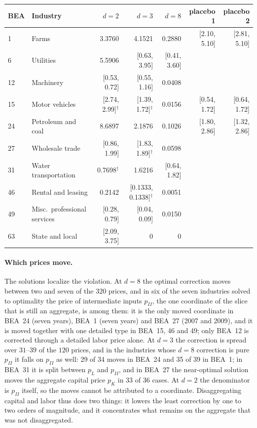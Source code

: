 \begin{table}[t]
{\small\begin{tabular}{llrrrrr}
\toprule
BEA & Industry & $d=2$ & $d=3$ & $d=8$ & placebo 1 & placebo 2 \\
\midrule
1 & Farms & 3.3760 & 4.1521 & 0.2880 & [2.10, 5.10] & [2.81, 5.10] \\
6 & Utilities & 5.5906 & [0.63, 3.95] & [0.41, 3.60] & & \\
12 & Machinery & [0.53, 0.72] & [0.55, 1.16] & 0.0408 & & \\
15 & Motor vehicles & [2.74, 2.99]$^\dagger$ & [1.39, 1.72]$^\dagger$ & 0.0156 & [0.54, 1.72] & [0.64, 1.72] \\
24 & Petroleum and coal & 8.6897 & 2.1876 & 0.1026 & [1.80, 2.86] & [1.32, 2.86] \\
27 & Wholesale trade & [0.86, 1.99] & [1.83, 1.89]$^\dagger$ & 0.0598 & & \\
31 & Water transportation & 0.7698$^\dagger$ & 1.6216 & [0.64, 1.82] & & \\
46 & Rental and leasing & 0.2142 & [0.1333, 0.1338]$^\dagger$ & 0.0051 & & \\
49 & Misc.\ professional services & [0.28, 0.79] & [0.04, 0.09] & 0.0150 & & \\
63 & State and local & [2.09, 3.75] & 0 & 0 & & \\
\bottomrule
\end{tabular}}
{}
\end{table}

\paragraph{Which prices move.} The solutions localize the violation. At $d=8$ the optimal correction moves between two and seven of the $320$ prices, and in six of the seven industries solved to optimality the price of intermediate inputs $p_{II}$, the one coordinate of the slice that is still an aggregate, is among them: it is the only moved coordinate in BEA~24 (seven years), BEA~1 (seven years) and BEA~27 (2007 and 2009), and it is moved together with one detailed type in BEA~15, 46 and 49; only BEA~12 is corrected through a detailed labor price alone. At $d=3$ the correction is spread over $31$--$39$ of the $120$ prices, and in the industries whose $d=8$ correction is pure $p_{II}$ it falls on $p_{II}$ as well: 29 of 34 moves in BEA~24 and 35 of 39 in BEA~1; in BEA~31 it is split between $p_L$ and $p_{II}$, and in BEA~27 the near-optimal solution moves the aggregate capital price $p_K$ in 33 of 36 cases. At $d=2$ the denominator is $p_{II}$ itself, so the moves cannot be attributed to a coordinate. Disaggregating capital and labor thus does two things: it lowers the least correction by one to two orders of magnitude, and it concentrates what remains on the aggregate that was not disaggregated.

